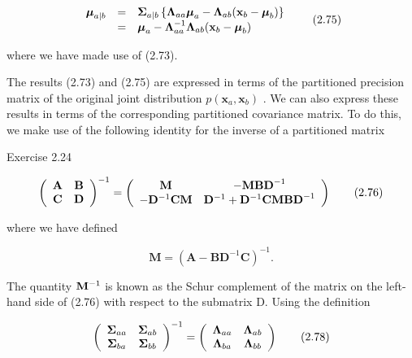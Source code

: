 \documentclass[
  10
]{article}
\begin{document}
\[
\begin{array}{r c l} \boldsymbol {\mu} _ {a | b} & = & \boldsymbol {\Sigma} _ {a | b} \left\{\boldsymbol {\Lambda} _ {a a} \boldsymbol {\mu} _ {a} - \boldsymbol {\Lambda} _ {a b} (\mathbf {x} _ {b} - \boldsymbol {\mu} _ {b}) \right\} \\ & = & \boldsymbol {\mu} _ {a} - \boldsymbol {\Lambda} _ {a a} ^ {- 1} \boldsymbol {\Lambda} _ {a b} (\mathbf {x} _ {b} - \boldsymbol {\mu} _ {b}) \end{array}\tag{2.75}
\]

where we have made use of (2.73).

The results (2.73) and (2.75) are expressed in terms of the partitioned
precision matrix of the original joint distribution
\(p ( \mathbf { x } _ { a } , \mathbf { x } _ { b } )\) . We can also
express these results in terms of the corresponding partitioned
covariance matrix. To do this, we make use of the following identity for
the inverse of a partitioned matrix

Exercise 2.24

\[
\left( \begin{array}{c c} \mathbf {A} & \mathbf {B} \\ \mathbf {C} & \mathbf {D} \end{array} \right) ^ {- 1} = \left( \begin{array}{c c} \mathbf {M} & - \mathbf {M B D} ^ {- 1} \\ - \mathbf {D} ^ {- 1} \mathbf {C M} & \mathbf {D} ^ {- 1} + \mathbf {D} ^ {- 1} \mathbf {C M B D} ^ {- 1} \end{array} \right)\tag{2.76}
\]

where we have defined

\[
\mathbf {M} = (\mathbf {A} - \mathbf {B D} ^ {- 1} \mathbf {C}) ^ {- 1}.\tag{2.77}
\]

The quantity \({ { \bf { M } } ^ { - 1 } }\) is known as the Schur
complement of the matrix on the left-hand side of (2.76) with respect to
the submatrix D. Using the definition

\[
\left( \begin{array}{c c} \boldsymbol {\Sigma} _ {a a} & \boldsymbol {\Sigma} _ {a b} \\ \boldsymbol {\Sigma} _ {b a} & \boldsymbol {\Sigma} _ {b b} \end{array} \right) ^ {- 1} = \left( \begin{array}{c c} \boldsymbol {\Lambda} _ {a a} & \boldsymbol {\Lambda} _ {a b} \\ \boldsymbol {\Lambda} _ {b a} & \boldsymbol {\Lambda} _ {b b} \end{array} \right)\tag{2.78}
\]
\end{document}
